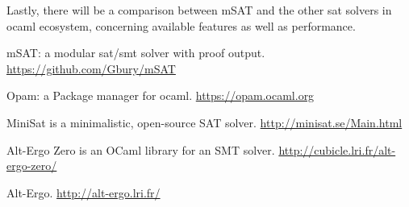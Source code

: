 \documentclass{llncs}
\def\msat{\textsf{mSAT}}
\begin{document}
Lastly, there will be a comparison between \msat{} and the other sat solvers
in ocaml ecosystem, concerning available features as well as performance.


\begin{thebibliography}{1}

    \msat{}: a modular sat/smt solver with proof output.
    \url{https://github.com/Gbury/mSAT}

    Opam: a Package manager for ocaml.
    \url{https://opam.ocaml.org}

    MiniSat is a minimalistic, open-source SAT solver.
    \url{http://minisat.se/Main.html}

    Alt-Ergo Zero is an OCaml library for an SMT solver.
    \url{http://cubicle.lri.fr/alt-ergo-zero/}

    Alt-Ergo.
    \url{http://alt-ergo.lri.fr/}

\end{thebibliography}
\end{document}
